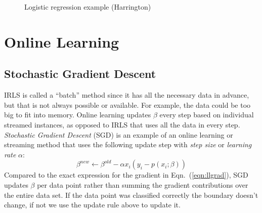 \documentclass[a4paper]{article}
\begin{document}
\begin{figure}
\centering
{}
\quad
{}

\quad
\caption{Logistic regression example (Harrington)}
\label{fig:Harrington}
\end{figure}


\section{Online Learning}
\subsection{Stochastic Gradient Descent}

IRLS is called a ``batch'' method since it has all the necessary data in advance, but that is not always possible or available.  For example, the data could be too big to fit into memory. Online learning updates $\beta$ every step based on individual streamed instances, as opposed to IRLS that uses all the data in every step. \emph{Stochastic Gradient Descent} (SGD) is an example of an online learning or streaming method that uses the following update step with \emph{step size} or \emph{learning rate} $\alpha$:
$$\beta^{new}\leftarrow \beta^{old}-\alpha x_i (y_i - p(x_i;\beta))$$
Compared to the exact expression for the gradient in Eqn.\ (\ref{eqn:llgrad}), SGD updates $\beta$ per data point rather than summing the gradient contributions over the entire data set.  If the data point was classified correctly the boundary doesn't change, if not we use the update rule above to update it.
\end{document}
